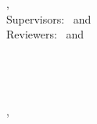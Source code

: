 \hfill
\vfill
{
	\small
	\textbf{\thesisName} \\
	\textit{\thesisTitle} \\
	\thesisSubject, \thesisDate \\
	Supervisors: \thesisFirstSupervisor\ and \thesisSecondSupervisor \\
	Reviewers: \thesisFirstReviewer\ and \thesisSecondReviewer \\ [1.5em]
	\textbf{\thesisUniversity} \\
	\thesisUniversityInstitute \\
	\thesisUniversityDepartment \\
	\thesisUniversityStreetAddress \\
	\thesisUniversityPostalCode , \thesisUniversityCity
}
